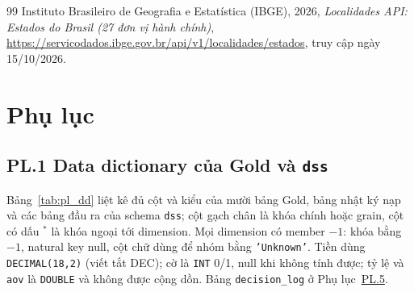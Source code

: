 \documentclass[a4paper]{article}
\begin{document}
\begin{thebibliography}{99}
Instituto Brasileiro de Geografia e Estatística (IBGE), 2026, \textit{Localidades API: Estados do Brasil (27 đơn vị hành chính)}, \url{https://servicodados.ibge.gov.br/api/v1/localidades/estados}, truy cập ngày 15/10/2026.


\end{thebibliography}

\newpage
{}
{}
\section*{Phụ lục}

\label{pl:1}
\subsection*{PL.1 Data dictionary của Gold và \texttt{dss}}

Bảng~\ref{tab:pl_dd} liệt kê đủ cột và kiểu của mười bảng Gold, bảng nhật ký nạp và các bảng đầu ra của schema \texttt{dss}; cột gạch chân là khóa chính hoặc grain, cột có dấu $^{*}$ là khóa ngoại tới dimension. Mọi dimension có member $-1$: khóa bằng $-1$, natural key null, cột chữ dùng để nhóm bằng \texttt{'Unknown'}. Tiền dùng \texttt{DECIMAL(18,2)} (viết tắt DEC); cờ là \texttt{INT} 0/1, null khi không tính được; tỷ lệ và \texttt{aov} là \texttt{DOUBLE} và không được cộng dồn. Bảng \texttt{decision\_\allowbreak{}log} ở Phụ lục~\hyperref[pl:5]{PL.5}.
\end{document}
